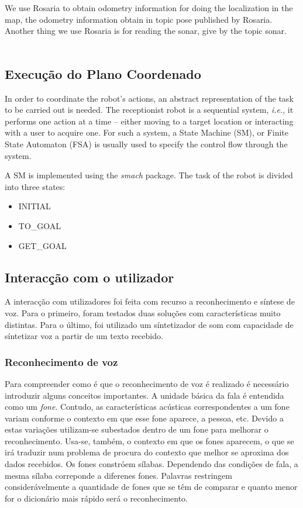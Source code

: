 \documentclass[journal]{IEEEtran}
\begin{document}
	We use Rosaria to obtain odometry information for doing the localization in the map, the odometry information obtain in topic pose published by Rosaria.
	Another thing we use Rosaria is for reading the sonar, give by the topic sonar.
	\\
	\\

\subsection{Execução do Plano Coordenado}


In order to coordinate the robot's actions, an abstract representation of the task to be carried out is needed. The receptionist robot is a sequential system, \textit{i.e.}, it performs one action at a time -- either moving to a target location or interacting with a user to acquire one. For such a system, a State Machine (SM), or Finite State Automaton (FSA) is usually used to specify the control flow through the system.

A SM is implemented using the \textit{smach} package. The task of the robot is divided into three states:
\begin{itemize}
	\item INITIAL
	\item TO\_GOAL
	\item GET\_GOAL
\end{itemize}

\subsection{Interacção com o utilizador}

A interacção com utilizadores foi feita com recurso a reconhecimento e síntese de voz. Para o primeiro, foram testados duas soluções com características muito distintas. Para o último, foi utilizado um síntetizador de som com capacidade de síntetizar voz a partir de um texto recebido.

\subsubsection{Reconhecimento de voz}

Para compreender como é que o reconhecimento de voz é realizado é necessário introduzir alguns conceitos importantes. A unidade básica da fala é entendida como um \emph{fone}. Contudo, as características acústicas correspondentes a um fone variam conforme o contexto em que esse fone aparece, a pessoa, etc. Devido a estas variações  utilizam-se subestados dentro de um fone para melhorar o reconhecimento. Usa-se, também, o contexto em que os fones aparecem, o que se irá traduzir num problema de procura do contexto que melhor se aproxima dos dados recebidos. Os fones constróem sílabas. Dependendo das condições de fala, a mesma sílaba correponde a diferenes fones. Palavras restringem considerávelmente a quantidade de fones que se têm de comparar e quanto menor for o dicionário mais rápido será o reconhecimento.
\end{document}
